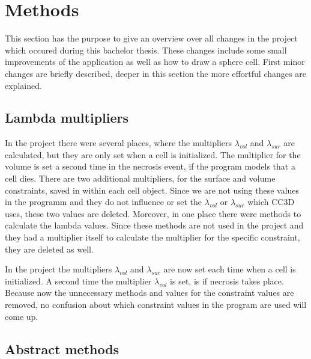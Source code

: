 \chapter{Methods}
    
This section has the purpose to give an overview over all changes in the project which occured during this bachelor thesis. These changes include some small improvements of the application as well as how to draw a sphere cell. First minor changes are briefly described, deeper in this section the more effortful changes are explained. 

\section{Lambda multipliers}
In the project there were several places, where the multipliers $\lambda_{vol}$ and $\lambda_{sur}$ are calculated, but they are only set when a cell is initialized. The multiplier for the volume is set a second time in the necrosis event, if the program models that a cell dies. \newline
There are two additional multipliers, for the surface and volume constraints, saved in within each cell object. Since we are not using these values in the programm and they do not influence or set the $\lambda_{vol}$ or $\lambda_{sur}$ which \ac{CC3D} uses, these two values are deleted. Moreover, in one place there were methods to calculate the lambda values. Since these methods are not used in the project and they had a multiplier itself to calculate the multiplier for the specific constraint, they are deleted as well. 

In the project the multipliers $\lambda_{vol}$ and $\lambda_{sur}$ are now set each time when a cell is initialized. A second time the multiplier $\lambda_{vol}$ is set, is if necrosis takes place. Because now the unnecessary methods and values for the constraint values are removed, no confusion about which constraint values in the program are used will come up.

\section{Abstract methods}


